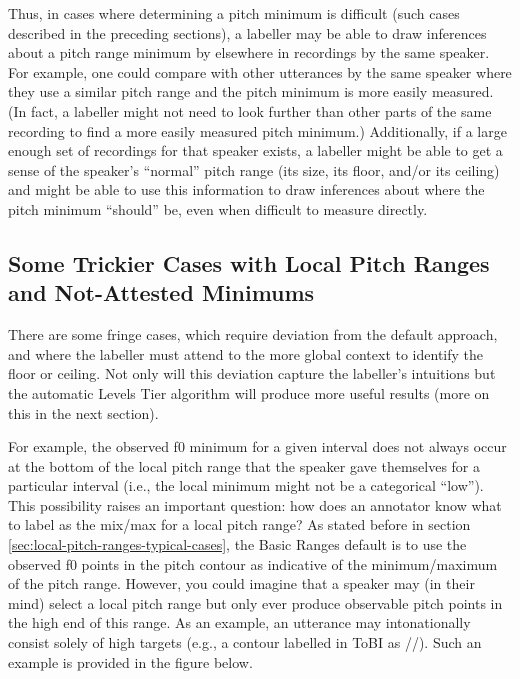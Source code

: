 \documentclass[11pt, twoside]{memoir}
\def\textlabel#1{{\relsize{-.5}\fontspec[Mapping=tex-text]{Roboto Mono}{#1}}}
\begin{document}
Thus, in cases where determining a pitch minimum is difficult (such cases described in the preceding sections), a labeller may be able to draw inferences about a pitch range minimum by elsewhere in recordings by the same speaker. For example, one could compare with other utterances by the same speaker where they use a similar pitch range and the pitch minimum is more easily measured. (In fact, a labeller might not need to look further than other parts of the same recording to find a more easily measured pitch minimum.) Additionally, if a large enough set of recordings for that speaker exists, a labeller might be able to get a sense of the speaker’s “normal” pitch range (its size, its floor, and/or its ceiling) and might be able to use this information to draw inferences about where the pitch minimum “should” be, even when difficult to measure directly.

\subsection{Some Trickier Cases with Local Pitch Ranges and Not-Attested Minimums}\label{sec:some-trickier-cases-with-local-pitch-ranges}

There are some fringe cases, which require deviation from the default approach, and where the labeller must attend to the more global context to identify the floor or ceiling. Not only will this deviation capture the labeller’s intuitions but the automatic Levels Tier algorithm will produce more useful results (more on this in the next section).

For example, the observed f0 minimum for a given interval does not always occur at the bottom of the local pitch range that the speaker gave themselves for a particular interval (i.e., the local minimum might not be a categorical “low”). This possibility raises an important question: how does an annotator know what to label as the mix\slash max for a local pitch range? As stated before in section \ref{sec:local-pitch-ranges-typical-cases}, the Basic Ranges default is to use the observed f0 points in the pitch contour as indicative of the minimum\slash maximum of the pitch range. However, you could imagine that a speaker may (in their mind) select a local pitch range but only ever produce observable pitch points in the high end of this range. As an example, an utterance may intonationally consist solely of high targets (e.g., a contour labelled in ToBI as /\textlabel{H* H* H-H\%}/). Such an example is provided in the figure below.
\end{document}
